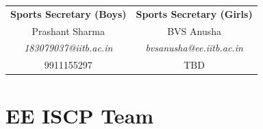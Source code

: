 \documentclass[openany]{book} %
\newcommand{\sectionlinetwo}[2]{%
  \nointerlineskip \vspace{.5\baselineskip}\hspace{\fill}
  {\resizebox{0.5\linewidth}{1.2ex}
    {\pgfornament[color = #1]{#2}
    }}%
    \hspace{\fill}
    \par\nointerlineskip \vspace{.5\baselineskip}
  }
\begin{document}
\bigbreak
\begin{center}
	\begin{tabular}{cc}
		  \textbf{Sports Secretary (Boys)}      &     \textbf{Sports Secretary (Girls)}\\
		         Prashant Sharma                &               BVS Anusha \\
		\textit{183079037@iitb.ac.in} &\textit{bvsanusha@ee.iitb.ac.in} \\
		            9911155297                  &                    TBD  \\
	\end{tabular}
\end{center}
\sectionlinetwo{magenta}{88}

\newpage
\section{EE ISCP Team}
\end{document}
